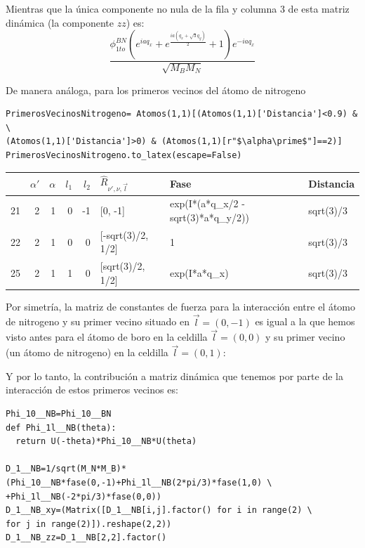 \documentclass[12pt,a4paper]{article}
\begin{document}
Mientras que la única componente no nula de la fila y columna 3 de esta matriz dinámica (la componente \(zz\)) es:
\begin{equation}
\label{eq:9}
\frac{\phi^{BN}_{1to} \left(e^{i a q_{x}} + e^{\frac{i a \left(q_{x} + \sqrt{3} q_{y}\right)}{2}} + 1\right) e^{- i a q_{x}}}{\sqrt{M_{B} M_{N}}}
\end{equation}

De manera análoga, para los primeros vecinos del átomo de nitrogeno

\begin{verbatim}
PrimerosVecinosNitrogeno= Atomos(1,1)[(Atomos(1,1)['Distancia']<0.9) & \
(Atomos(1,1)['Distancia']>0) & (Atomos(1,1)[r"$\alpha\prime$"]==2)]
PrimerosVecinosNitrogeno.to_latex(escape=False)
\end{verbatim}

\begin{tabular}{lrrrrlll}
\toprule
{} &  $\alpha\prime$ &  $\alpha$ &  $l_1$ &  $l_2$ & $\hat R_{\nu\prime,\nu,\vec l}$ &                                Fase &  Distancia \\
\midrule
21 &               2 &         1 &      0 &     -1 &                         [0, -1] &  exp(I*(a*q_x/2 - sqrt(3)*a*q_y/2)) &  sqrt(3)/3 \\
22 &               2 &         1 &      0 &      0 &               [-sqrt(3)/2, 1/2] &                                   1 &  sqrt(3)/3 \\
25 &               2 &         1 &      1 &      0 &                [sqrt(3)/2, 1/2] &                        exp(I*a*q_x) &  sqrt(3)/3 \\
\bottomrule
\end{tabular}

\vspace{0.5cm}

Por simetría, la matriz de constantes de fuerza para la interacción entre el átomo de nitrogeno y su primer vecino situado en \(\vec l= (0,-1)\) es igual a la que hemos visto antes para el átomo de boro en la celdilla \(\vec l= (0,0)\) y su primer vecino (un átomo de nitrogeno) en la celdilla \(\vec l= (0,1)\):

Y por lo tanto, la contribución a matriz dinámica que tenemos por parte de la interacción de estos primeros vecinos es:

\begin{verbatim}
Phi_10__NB=Phi_10__BN
def Phi_1l__NB(theta):
  return U(-theta)*Phi_10__NB*U(theta)

D_1__NB=1/sqrt(M_N*M_B)*(Phi_10__NB*fase(0,-1)+Phi_1l__NB(2*pi/3)*fase(1,0) \
+Phi_1l__NB(-2*pi/3)*fase(0,0))
D_1__NB_xy=(Matrix([D_1__NB[i,j].factor() for i in range(2) \
for j in range(2)]).reshape(2,2))
D_1__NB_zz=D_1__NB[2,2].factor()
\end{verbatim}
\end{document}
